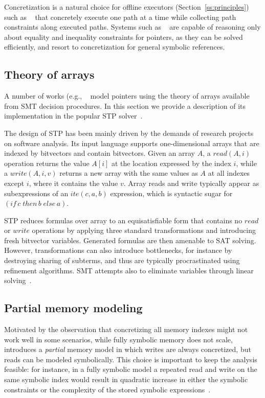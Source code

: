 Concretization is a natural choice for offline executors (Section~\ref{ss:principles}) such as ~\cite{DART-PLDI05,SAGE-NDSS08} that concretely execute one path at a time while collecting path constraints along executed paths. Systems such as ~\cite{CREST-ASE08,CUTE-FSE13} are capable of reasoning only about equality and inequality constraints for pointers, as they can be solved efficiently, and resort to concretization for general symbolic references.



\subsection{Theory of arrays}
A number of works (e.g., ~\cite{EXE-CCS06,KLEE-OSDI08,SAGE-NDSS08} model pointers using the theory of arrays available from SMT decision procedures. In this section we provide a description of its implementation in the popular STP solver~\cite{STP-CAV07}.

The design of STP has been mainly driven by the demands of research projects on software analysis. Its input language supports one-dimensional arrays that are indexed by bitvectors and contain bitvectors. Given an array $A$, a $read(A,i)$ operation returns the value $A[i]$ at the location expressed by the index $i$, while a $write(A,i,v)$ returns a new array with the same values as $A$ at all indexes except $i$, where it contains the value $v$. Array reads and write typically appear as subexpressions of an $ite(c,a,b)$ expression, which is syntactic sugar for $(if\,c\;then\,b\;else\,a)$.

STP reduces formulas over array to an equisatisfiable form that contains no $read$ or $write$ operations by applying three standard transformations and introducing fresh bitvector variables. Generated formulas are then amenable to SAT solving. However, transformations can also introduce bottlenecks, for instance by destroying sharing of subterms, and thus are typically procrastinated using refinement algorithms. SMT attempts also to eliminate variables through linear solving~\cite{STP-CAV07}.

\subsection{Partial memory modeling}
\label{ss:index-based-memory}
Motivated by the observation that concretizing all memory indexes might not work well in some scenarios, while fully symbolic memory does not scale, ~\cite{MAYHEM-SP12} introduces a {\em partial} memory model in which writes are always concretized, but reads can be modeled symbolically. This choice is important to keep the analysis feasible: for instance, in a fully symbolic model a repeated read and write on the same symbolic index would result in quadratic increase in either the symbolic constraints or the complexity of the stored symbolic expressions~\cite{DRILLER-NDSS16}.


